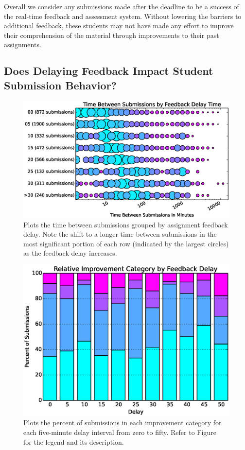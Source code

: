 Overall we consider any submissions made after the deadline to be a success of
the real-time feedback and assessment system. Without lowering the barriers to
additional feedback, these students may not have made any effort to improve
their comprehension of the material through improvements to their past
assignments.

\subsection{Does Delaying Feedback Impact Student Submission Behavior?}

\begin{figure}[!t]
\centering
\includegraphics[width=5.75in]{graphs/Time_Between_Submissions_by_Feedback_Delay_Time.eps}
\caption{Plots the time between submissions grouped by assignment feedback
  delay. Note the shift to a longer time between submissions in the most
  significant portion of each row (indicated by the largest circles) as the
  feedback delay increases.}
\end{figure}

\begin{figure}[!t]
\centering
\includegraphics[width=5.25in]{graphs/Relative_Improvement_Category_by_Feedback_Delay.eps}
\caption{Plots the percent of submissions in each improvement category for each
  five-minute delay interval from zero to fifty. Refer to
  Figure~ for the legend and its description.}
\end{figure}

